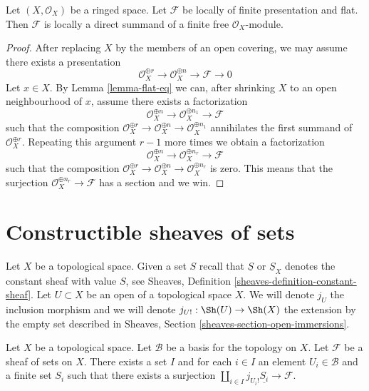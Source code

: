 \begin{lemma}
\label{lemma-flat-locally-finite-presentation}
Let $(X, \mathcal{O}_X)$ be a ringed space. Let $\mathcal{F}$
be locally of finite presentation and flat. Then $\mathcal{F}$ is
locally a direct summand of a finite free $\mathcal{O}_X$-module.
\end{lemma}

\begin{proof}
After replacing $X$ by the members of an open covering, we may
assume there exists a presentation
$$
\mathcal{O}_X^{\oplus r} \to
\mathcal{O}_X^{\oplus n} \to \mathcal{F} \to 0
$$
Let $x \in X$. By Lemma \ref{lemma-flat-eq}
we can, after shrinking $X$ to an open
neighbourhood of $x$, assume there exists a factorization
$$
\mathcal{O}_X^{\oplus n} \to
\mathcal{O}_X^{\oplus n_1} \to \mathcal{F}
$$
such that the composition
$\mathcal{O}_X^{\oplus r} \to \mathcal{O}_X^{\oplus n} \to
\mathcal{O}_X^{\oplus n_1}$
annihilates the first summand of $\mathcal{O}_X^{\oplus r}$.
Repeating this argument $r - 1$ more times we obtain a factorization
$$
\mathcal{O}_X^{\oplus n} \to
\mathcal{O}_X^{\oplus n_r} \to \mathcal{F}
$$
such that the composition
$\mathcal{O}_X^{\oplus r} \to \mathcal{O}_X^{\oplus n}
\to \mathcal{O}_X^{\oplus n_r}$ is zero.
This means that the surjection $\mathcal{O}_X^{\oplus n_r} \to \mathcal{F}$
has a section and we win.
\end{proof}







\section{Constructible sheaves of sets}
\label{section-constructible}

\noindent
Let $X$ be a topological space. Given a set $S$ recall that $\underline{S}$
or $\underline{S}_X$ denotes the constant sheaf with value $S$, see
Sheaves, Definition \ref{sheaves-definition-constant-sheaf}.
Let $U \subset X$ be an open of a topological space $X$.
We will denote $j_U$ the inclusion morphism and we will denote
$j_{U!} : \Sh(U) \to \Sh(X)$ the extension by the empty set
described in Sheaves, Section \ref{sheaves-section-open-immersions}.

\begin{lemma}
\label{lemma-surjection}
Let $X$ be a topological space. Let $\mathcal{B}$ be a basis for the
topology on $X$. Let $\mathcal{F}$ be a sheaf of sets on $X$.
There exists a set $I$ and for each $i \in I$ an element
$U_i \in \mathcal{B}$ and a finite set $S_i$ such that there exists
a surjection $\coprod_{i \in I} j_{U_i!}\underline{S_i} \to \mathcal{F}$.
\end{lemma}

